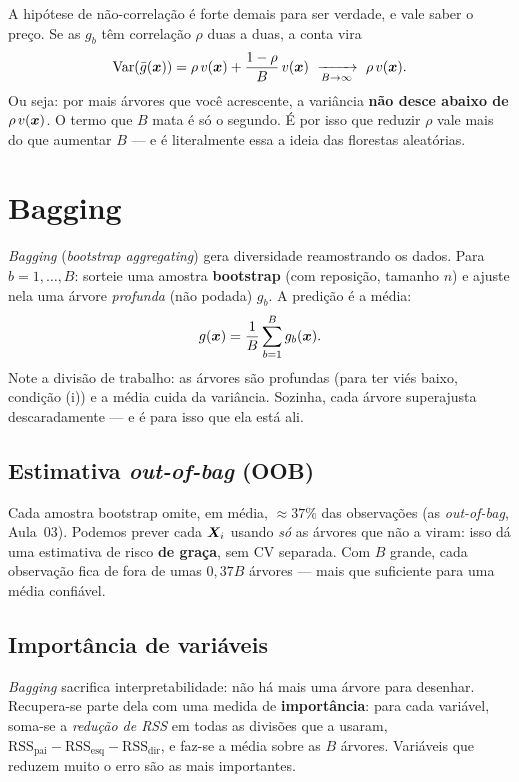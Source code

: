 \documentclass[11pt,a4paper]{article}
\begin{document}
\begin{observacao}
A hipótese de não-correlação é forte demais para ser verdade, e vale saber o preço.
Se as $g_b$ têm correlação $\rho$ duas a duas, a conta vira
\[
  \operatorname{Var}(\bar g(\bm{x})) = \rho\, v(\bm{x}) + \frac{1-\rho}{B}\,v(\bm{x})
  \ \xrightarrow[B\to\infty]{}\ \rho\,v(\bm{x}).
\]
Ou seja: por mais árvores que você acrescente, a variância \textbf{não desce abaixo
de $\rho\,v(\bm{x})$}. O termo que $B$ mata é só o segundo. É por isso que reduzir
$\rho$ vale mais do que aumentar $B$ --- e é literalmente essa a ideia das florestas
aleatórias.
\end{observacao}

\section{Bagging}
\emph{Bagging} (\emph{bootstrap aggregating}) gera diversidade reamostrando os
dados. Para $b=1,\dots,B$: sorteie uma amostra \textbf{bootstrap} (com reposição,
tamanho $n$) e ajuste nela uma árvore \emph{profunda} (não podada) $g_b$. A predição
é a média:
\begin{equation}\label{eq:bagging}
  g(\bm{x}) = \frac1B\sum_{b=1}^B g_b(\bm{x}).
\end{equation}
Note a divisão de trabalho: as árvores são profundas (para ter viés baixo, condição
(i)) e a média cuida da variância. Sozinha, cada árvore superajusta
descaradamente --- e é para isso que ela está ali.

\subsection{Estimativa \emph{out-of-bag} (OOB)}
Cada amostra bootstrap omite, em média, $\approx 37\%$ das observações (as
\emph{out-of-bag}, Aula~03). Podemos prever cada $\bm{X}_i$ usando \emph{só} as árvores
que não a viram: isso dá uma estimativa de risco \textbf{de graça}, sem CV
separada. Com $B$ grande, cada observação fica de fora de umas $0{,}37B$ árvores ---
mais que suficiente para uma média confiável.

\subsection{Importância de variáveis}
\emph{Bagging} sacrifica interpretabilidade: não há mais uma árvore para desenhar.
Recupera-se parte dela com uma medida de \textbf{importância}: para cada variável,
soma-se a \emph{redução de RSS} em todas as divisões que a usaram,
$\mathrm{RSS}_{\text{pai}}-\mathrm{RSS}_{\text{esq}}-\mathrm{RSS}_{\text{dir}}$, e
faz-se a média sobre as $B$ árvores. Variáveis que reduzem muito o erro são as mais
importantes.
\end{document}
